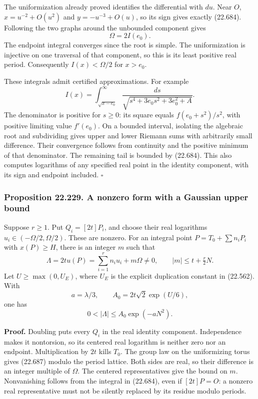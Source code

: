 \documentclass[
  11pt,
  a4paper,
]{article}
\begin{document}
The uniformization already proved identifies the differential with
\(du\). Near \(O\), \(x=u^{-2}+O(u^2)\) and \(y=-u^{-3}+O(u)\), so its
sign gives exactly (22.684). Following the two graphs around the
unbounded component gives \[
 \Omega=2I(e_0).
 \tag{22.685}
\] The endpoint integral converges since the root is simple. The
uniformization is injective on one traversal of that component, so this
is its least positive real period. Consequently \(I(x)<\Omega/2\) for
\(x>e_0\).

These integrals admit certified approximations. For example \[
 I(x)=\int_{\sqrt{x-e_0}}^\infty
 \frac{ds}{\sqrt{s^4+3e_0s^2+3e_0^2+A}}.
 \tag{22.686}
\] The denominator is positive for \(s\ge0\): its square equals
\(f(e_0+s^2)/s^2\), with positive limiting value \(f'(e_0)\). On a
bounded interval, isolating the algebraic root and subdividing gives
upper and lower Riemann sums with arbitrarily small difference. Their
convergence follows from continuity and the positive minimum of that
denominator. The remaining tail is bounded by (22.684). This also
computes logarithms of any specified real point in the identity
component, with its sign and endpoint included. \(\square\)

\subsubsection{Proposition 22.229. A nonzero form with a Gaussian upper
bound}\label{proposition-22.229.-a-nonzero-form-with-a-gaussian-upper-bound}

Suppose \(r\ge1\). Put \(Q_i=[2t]P_i\), and choose their real logarithms
\(u_i\in(-\Omega/2,\Omega/2)\). These are nonzero. For an integral point
\(P=T_0+\sum n_iP_i\) with \(x(P)\ge H\), there is an integer \(m\) such
that \[
 \Lambda=2t u(P)=\sum_{i=1}^r n_i u_i+m\Omega\ne0,
 \qquad |m|\le t+\tfrac r2N.
 \tag{22.687}
\] Let \(U\ge\max(0,U_E)\), where \(U_E\) is the explicit duplication
constant in (22.562). With \[
 a=\lambda/3,\qquad A_0=2t\sqrt2\exp(U/6),
 \tag{22.688}
\] one has \[
 0<|\Lambda|\le A_0\exp(-aN^2).
 \tag{22.689}
\]

\textbf{Proof.} Doubling puts every \(Q_i\) in the real identity
component. Independence makes it nontorsion, so its centered real
logarithm is neither zero nor an endpoint. Multiplication by \(2t\)
kills \(T_0\). The group law on the uniformizing torus gives (22.687)
modulo the period lattice. Both sides are real, so their difference is
an integer multiple of \(\Omega\). The centered representatives give the
bound on \(m\). Nonvanishing follows from the integral in (22.684), even
if \([2t]P=O\): a nonzero real representative must not be silently
replaced by its residue modulo periods.
\end{document}
